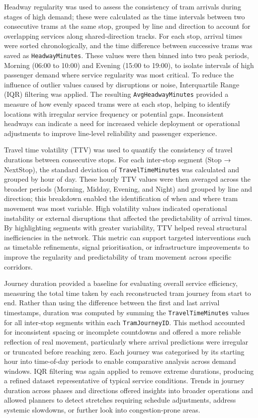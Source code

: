     Headway regularity was used to assess the consistency of tram arrivals during stages of high demand; these were calculated as the time intervals between two consecutive trams at the same stop, grouped by line and direction to account for overlapping services along shared-direction tracks. For each stop, arrival times were sorted chronologically, and the time difference between successive trams was saved as \texttt{HeadwayMinutes}. These values were then binned into two peak periods, Morning (06:00 to 10:00) and Evening (15:00 to 19:00), to isolate intervals of high passenger demand where service regularity was most critical. To reduce the influence of outlier values caused by disruptions or noise, Interquartile Range (IQR) filtering was applied. The resulting \texttt{AvgHeadwayMinutes} provided a measure of how evenly spaced trams were at each stop, helping to identify locations with irregular service frequency or potential gaps. Inconsistent headways can indicate a need for increased vehicle deployment or operational adjustments to improve line-level reliability and passenger experience.

    Travel time volatility (TTV) was used to quantify the consistency of travel durations between consecutive stops. For each inter-stop segment (Stop → NextStop), the standard deviation of \texttt{TravelTimeMinutes} was calculated and grouped by hour of day. These hourly TTV values were then averaged across the broader periods (Morning, Midday, Evening, and Night) and grouped by line and direction; this breakdown enabled the identification of when and where tram movement was most variable. High volatility values indicated operational instability or external disruptions that affected the predictability of arrival times. By highlighting segments with greater variability, TTV helped reveal structural inefficiencies in the network. This metric can support targeted interventions such as timetable refinements, signal prioritisation, or infrastructure improvements to improve the regularity and predictability of tram movement across specific corridors.

    Journey duration provided a baseline for evaluating overall service efficiency, measuring the total time taken by each reconstructed tram journey from start to end. Rather than using the difference between the first and last arrival timestamps, duration was computed by summing the \texttt{TravelTimeMinutes} values for all inter-stop segments within each \texttt{TramJourneyID}. This method accounted for inconsistent spacing or incomplete countdowns and offered a more reliable reflection of real movement, particularly where arrival predictions were irregular or truncated before reaching zero. Each journey was categorised by its starting hour into time-of-day periods to enable comparative analysis across demand windows. IQR filtering was again applied to remove extreme durations, producing a refined dataset representative of typical service conditions. Trends in journey duration across phases and directions offered insights into broader operations and allowed planners to detect stretches requiring schedule adjustments, address systemic slowdowns, or further look into congestion-prone areas.

